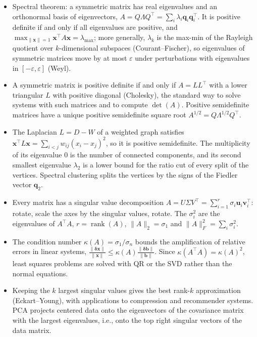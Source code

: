 \documentclass[11pt]{article}
\newcommand{\norm}[1]{\lVert #1 \rVert}
\theoremstyle{definition}
\theoremstyle{plain}
\theoremstyle{remark}
\DeclareMathOperator{\rank}{rank}
\begin{document}
\begin{itemize}[leftmargin=*]
    \item Spectral theorem: a symmetric matrix has real eigenvalues and an orthonormal basis of eigenvectors, $A = Q\Lambda Q^\top = \sum_i \lambda_i \mathbf{q}_i \mathbf{q}_i^\top$. It is positive definite if and only if all eigenvalues are positive, and $\max_{\norm{\mathbf{x}} = 1} \mathbf{x}^\top A \mathbf{x} = \lambda_{\max}$; more generally, $\lambda_k$ is the max-min of the Rayleigh quotient over $k$-dimensional subspaces (Courant--Fischer), so eigenvalues of symmetric matrices move by at most $\varepsilon$ under perturbations with eigenvalues in $[-\varepsilon, \varepsilon]$ (Weyl).
    \item A symmetric matrix is positive definite if and only if $A = LL^\top$ with a lower triangular $L$ with positive diagonal (Cholesky), the standard way to solve systems with such matrices and to compute $\det(A)$. Positive semidefinite matrices have a unique positive semidefinite square root $A^{1/2} = Q\Lambda^{1/2}Q^\top$.
    \item The Laplacian $L = D - W$ of a weighted graph satisfies $\mathbf{x}^\top L\mathbf{x} = \sum_{i < j} w_{ij}(x_i - x_j)^2$, so it is positive semidefinite. The multiplicity of its eigenvalue $0$ is the number of connected components, and its second smallest eigenvalue $\lambda_2$ is a lower bound for the ratio cut of every split of the vertices. Spectral clustering splits the vertices by the signs of the Fiedler vector $\mathbf{q}_2$.
    \item Every matrix has a singular value decomposition $A = U\Sigma V^\top = \sum_{i=1}^r \sigma_i \mathbf{u}_i \mathbf{v}_i^\top$: rotate, scale the axes by the singular values, rotate. The $\sigma_i^2$ are the eigenvalues of $A^\top A$, $r = \rank(A)$, $\norm{A}_2 = \sigma_1$ and $\norm{A}_F^2 = \sum_i \sigma_i^2$.
    \item The condition number $\kappa(A) = \sigma_1/\sigma_n$ bounds the amplification of relative errors in linear systems, $\frac{\norm{\boldsymbol{\delta}\mathbf{x}}}{\norm{\mathbf{x}}} \leq \kappa(A)\frac{\norm{\boldsymbol{\delta}\mathbf{b}}}{\norm{\mathbf{b}}}$. Since $\kappa(A^\top A) = \kappa(A)^2$, least squares problems are solved with QR or the SVD rather than the normal equations.
    \item Keeping the $k$ largest singular values gives the best rank-$k$ approximation (Eckart--Young), with applications to compression and recommender systems. PCA projects centered data onto the eigenvectors of the covariance matrix with the largest eigenvalues, i.e., onto the top right singular vectors of the data matrix.
\end{itemize}
\end{document}

